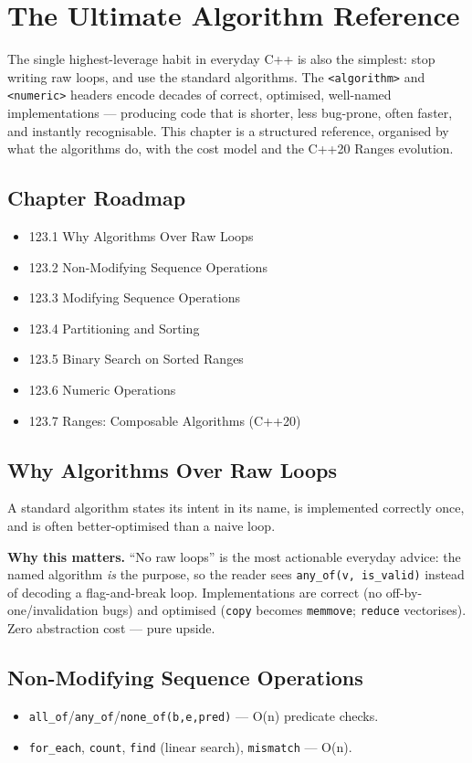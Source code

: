 \chapter{The Ultimate Algorithm Reference}

The single highest-leverage habit in everyday C++ is also the simplest: stop writing raw loops, and use the standard algorithms. The \texttt{<algorithm>} and \texttt{<numeric>} headers encode decades of correct, optimised, well-named implementations --- producing code that is shorter, less bug-prone, often faster, and instantly recognisable. This chapter is a structured reference, organised by what the algorithms do, with the cost model and the C++20 Ranges evolution.

\section*{Chapter Roadmap}
\begin{itemize}
\item 123.1 Why Algorithms Over Raw Loops
\item 123.2 Non-Modifying Sequence Operations
\item 123.3 Modifying Sequence Operations
\item 123.4 Partitioning and Sorting
\item 123.5 Binary Search on Sorted Ranges
\item 123.6 Numeric Operations
\item 123.7 Ranges: Composable Algorithms (C++20)
\end{itemize}

\section{Why Algorithms Over Raw Loops}
A standard algorithm states its intent in its name, is implemented correctly once, and is often better-optimised than a naive loop.

\textbf{Why this matters.} ``No raw loops'' is the most actionable everyday advice: the named algorithm \emph{is} the purpose, so the reader sees \texttt{any\_of(v, is\_valid)} instead of decoding a flag-and-break loop. Implementations are correct (no off-by-one/invalidation bugs) and optimised (\texttt{copy} becomes \texttt{memmove}; \texttt{reduce} vectorises). Zero abstraction cost --- pure upside.

\section{Non-Modifying Sequence Operations}
\begin{itemize}
\item \texttt{all\_of}/\texttt{any\_of}/\texttt{none\_of(b,e,pred)} --- O(n) predicate checks.
\item \texttt{for\_each}, \texttt{count}, \texttt{find} (linear search), \texttt{mismatch} --- O(n).
\end{itemize}

